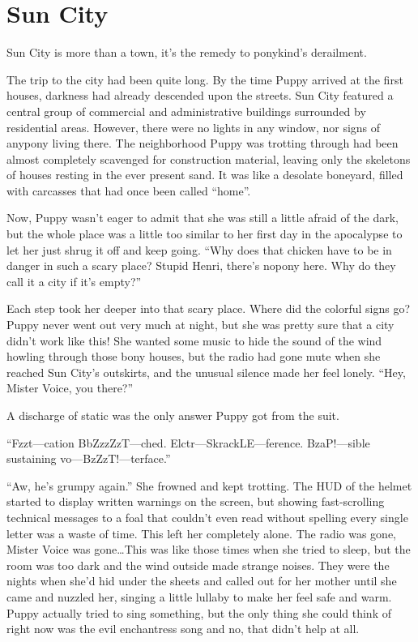 
\chapter{Sun City}


\begin{intro}
Sun City is more than a town, it's the remedy to ponykind's derailment.
\end{intro}



The trip to the city had been quite long. By the time Puppy arrived at the first houses, darkness had already descended upon the streets. Sun City featured a central group of commercial and administrative buildings surrounded by residential areas. However, there were no lights in any window, nor signs of anypony living there. The neighborhood Puppy was trotting through had been almost completely scavenged for construction material, leaving only the skeletons of houses resting in the ever present sand. It was like a desolate boneyard, filled with carcasses that had once been called ``home''.

Now, Puppy wasn't eager to admit that she was still a little afraid of the dark, but the whole place was a little too similar to her first day in the apocalypse to let her just shrug it off and keep going. ``Why does that chicken have to be in danger in such a scary place? Stupid Henri, there's nopony here. Why do they call it a city if it's empty?''

Each step took her deeper into that scary place. Where did the colorful signs go? Puppy never went out very much at night, but she was pretty sure that a city didn't work like this! She wanted some music to hide the sound of the wind howling through those bony houses, but the radio had gone mute when she reached Sun City's outskirts, and the unusual silence made her feel lonely. ``Hey, Mister Voice, you there?''

A discharge of static was the only answer Puppy got from the suit.

{\mt ``Fzzt---cation BbZzzZzT---ched. Elctr---SkrackLE---ference. BzaP!---sible sustaining vo---BzZzT!---terface.''}

``Aw, he's grumpy again.'' She frowned and kept trotting. The HUD of the helmet started to display written warnings on the screen, but showing fast-scrolling technical messages to a foal that couldn't even read without spelling every single letter was a waste of time. This left her completely alone. The radio was gone, Mister Voice was gone\dots This was like those times when she tried to sleep, but the room was too dark and the wind outside made strange noises. They were the nights when she'd hid under the sheets and called out for her mother until she came and nuzzled her, singing a little lullaby to make her feel safe and warm. Puppy actually tried to sing something, but the only thing she could think of right now was the evil enchantress song and no, that didn't help at all.

